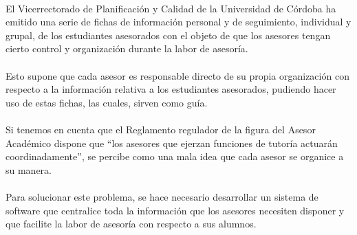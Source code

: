 \paragraph{}El Vicerrectorado de Planificación y Calidad de la Universidad de
Córdoba ha emitido una serie de fichas de información personal y de seguimiento,
individual y grupal, de los estudiantes asesorados con el objeto de que los
asesores tengan cierto control y organización durante la labor de asesoría.

\paragraph{}Esto supone que cada asesor es responsable directo de su propia
organización con respecto a la información relativa a los estudiantes
asesorados, pudiendo hacer uso de estas fichas, las cuales, sirven como guía.

\paragraph{}Si tenemos en cuenta que el Reglamento regulador de la figura del
Asesor Académico dispone que ``los asesores que ejerzan funciones de tutoría
actuarán coordinadamente'', se percibe como una mala idea que cada asesor se
organice a su manera.

\paragraph{}Para solucionar este problema, se hace necesario desarrollar un
sistema de software que centralice toda la información que los asesores
necesiten disponer y que facilite la labor de asesoría con respecto a sus
alumnos.
